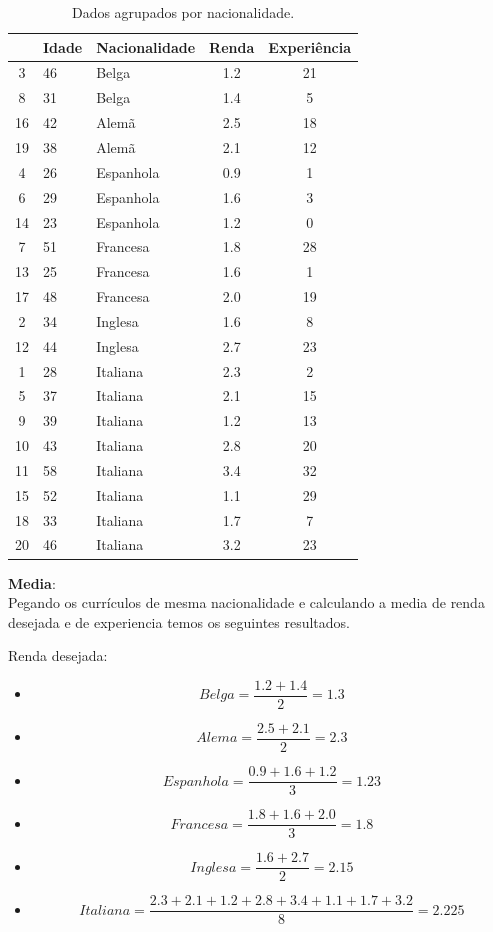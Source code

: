 \documentclass[a4paper,11pt]{article}
\begin{document}
\begin{description}[leftmargin=*]
\begin{table}[H]
    \centering
    \label{tab_agrupada}
    \begin{tabular}{c l l c c}
        \toprule
        & \textbf{Idade} & \textbf{Nacionalidade} & \textbf{Renda} & \textbf{Experiência} \\
        \midrule
        3  & 46 & Belga     & 1.2 & 21 \\
        8  & 31 & Belga     & 1.4 & 5 \\
        16 & 42 & Alemã     & 2.5 & 18 \\
        19 & 38 & Alemã     & 2.1 & 12 \\
        4  & 26 & Espanhola & 0.9 & 1 \\
        6  & 29 & Espanhola & 1.6 & 3 \\
        14 & 23 & Espanhola & 1.2 & 0 \\
        7  & 51 & Francesa  & 1.8 & 28 \\
        13 & 25 & Francesa  & 1.6 & 1 \\
        17 & 48 & Francesa  & 2.0 & 19 \\
        2  & 34 & Inglesa   & 1.6 & 8 \\
        12 & 44 & Inglesa   & 2.7 & 23 \\
        1  & 28 & Italiana  & 2.3 & 2 \\
        5  & 37 & Italiana  & 2.1 & 15 \\
        9  & 39 & Italiana  & 1.2 & 13 \\
        10 & 43 & Italiana  & 2.8 & 20 \\
        11 & 58 & Italiana  & 3.4 & 32 \\
        15 & 52 & Italiana  & 1.1 & 29 \\
        18 & 33 & Italiana  & 1.7 & 7 \\
        20 & 46 & Italiana  & 3.2 & 23 \\
        \bottomrule
    \end{tabular}
    \caption{Dados agrupados por nacionalidade.}
\end{table}

\item \textbf{Media}: \\
Pegando os currículos de mesma nacionalidade e calculando a media de renda desejada e de experiencia temos os seguintes resultados.

\vspace{5mm} %

Renda desejada:
\begin{itemize}
    \item \[Belga = \frac{1.2 + 1.4}{2} = 1.3\]
    \item \[Alema = \frac{2.5 + 2.1}{2} = 2.3\]
    \item \[Espanhola = \frac{0.9 + 1.6 + 1.2}{3} = 1.23\]
    \item \[Francesa = \frac{1.8 + 1.6 + 2.0}{3} = 1.8\]
    \item \[Inglesa = \frac{1.6 + 2.7}{2} = 2.15\]
    \item \[Italiana = \frac{2.3 + 2.1 + 1.2 + 2.8 + 3.4 + 1.1 + 1.7 + 3.2}{8} = 2.225\]
\end{itemize}


\end{description}
\end{document}
